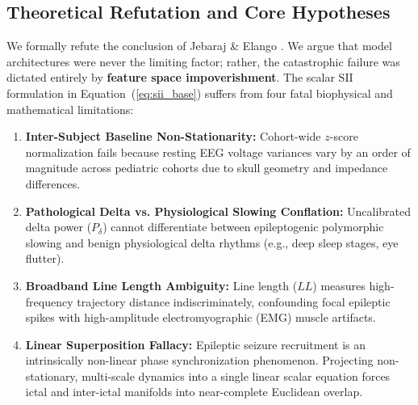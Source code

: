 \documentclass[pdflatex,sn-mathphys-num]{sn-jnl}
\begin{document}
\subsection{Theoretical Refutation and Core Hypotheses}
We formally refute the conclusion of Jebaraj \& Elango \cite{jebaraj2026}. We argue that model architectures were never the limiting factor; rather, the catastrophic failure was dictated entirely by \textbf{feature space impoverishment}. The scalar $\text{SII}$ formulation in Equation~(\ref{eq:sii_base}) suffers from four fatal biophysical and mathematical limitations:
\begin{enumerate}
    \item \textbf{Inter-Subject Baseline Non-Stationarity:} Cohort-wide $z$-score normalization fails because resting EEG voltage variances vary by an order of magnitude across pediatric cohorts due to skull geometry and impedance differences.
    \item \textbf{Pathological Delta vs. Physiological Slowing Conflation:} Uncalibrated delta power ($P_\delta$) cannot differentiate between epileptogenic polymorphic slowing and benign physiological delta rhythms (e.g., deep sleep stages, eye flutter).
    \item \textbf{Broadband Line Length Ambiguity:} Line length ($LL$) measures high-frequency trajectory distance indiscriminately, confounding focal epileptic spikes with high-amplitude electromyographic (EMG) muscle artifacts.
    \item \textbf{Linear Superposition Fallacy:} Epileptic seizure recruitment is an intrinsically non-linear phase synchronization phenomenon. Projecting non-stationary, multi-scale dynamics into a single linear scalar equation forces ictal and inter-ictal manifolds into near-complete Euclidean overlap.
\end{enumerate}
\end{document}
